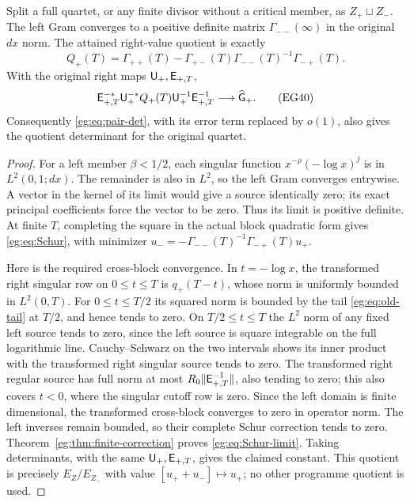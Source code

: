 \documentclass[11pt]{article}
\begin{document}
\begin{egproposition}\label{eg:prop:left-minimum}
Split a full quartet, or any finite divisor without a critical member,
as $Z_+\sqcup Z_-$. The left Gram converges to a positive definite
matrix $\Gamma_{--}(\infty)$ in the original $dx$ norm. The attained
right-value quotient is exactly
\[
 Q_+(T)=\Gamma_{++}(T)-\Gamma_{+-}(T)
                     \Gamma_{--}(T)^{-1}\Gamma_{-+}(T).
 \tag{EG39}\label{eg:eq:Schur}
\]
With the original right maps $\mathsf U_+,\mathsf E_{+,T}$,
\[
 \mathsf E_{+,T}^{-*}\mathsf U_+^{-*}Q_+(T)\mathsf U_+^{-1}\mathsf E_{+,T}^{-1}
                             \longrightarrow\widehat{\mathsf G}_+.
 \tag{EG40}\label{eg:eq:Schur-limit}
\]
Consequently \eqref{eg:eq:pair-det}, with its error term replaced by
$o(1)$, also gives the quotient determinant for the original quartet.
\end{egproposition}
\begin{proof}
For a left member $\beta<1/2$, each singular function
$x^{-\rho}(-\log x)^j$ is in $L^2(0,1;dx)$. The remainder is also
in $L^2$, so the left Gram converges entrywise. A vector in the
kernel of its limit would give a source identically zero; its exact
principal coefficients force the vector to be zero. Thus its limit
is positive definite. At finite $T$, completing the square in the
actual block quadratic form gives \eqref{eg:eq:Schur}, with minimizer
$u_-=-\Gamma_{--}(T)^{-1}\Gamma_{-+}(T)u_+$.

Here is the required cross-block convergence. In $t=-\log x$,
the transformed right singular row on $0\le t\le T$ is
$q_+(T-t)$, whose norm is uniformly bounded in $L^2(0,T)$.
For $0\le t\le T/2$ its squared norm is bounded by the tail
\eqref{eg:eq:old-tail} at $T/2$, and hence tends to zero. On
$T/2\le t\le T$ the $L^2$ norm of any fixed left source tends
to zero, since the left source is square integrable on the full
logarithmic line. Cauchy--Schwarz on the two intervals shows its
inner product with the transformed right singular source tends
to zero. The transformed right regular source has full norm at
most $R_0\|\mathsf E_{+,T}^{-1}\|$, also tending to zero; this also
covers $t<0$, where the singular cutoff row is zero. Since the
left domain is finite dimensional, the transformed cross-block
converges to zero in operator norm. The left inverses remain
bounded, so their complete Schur correction tends to zero.
Theorem~\ref{eg:thm:finite-correction} proves \eqref{eg:eq:Schur-limit}.
Taking determinants, with the same $\mathsf U_+,\mathsf E_{+,T}$, gives the
claimed constant. This quotient is precisely $E_Z/E_{Z_-}$ with
value $[u_++u_-]\mapsto u_+$; no other programme quotient is used.
\end{proof}
\end{document}
